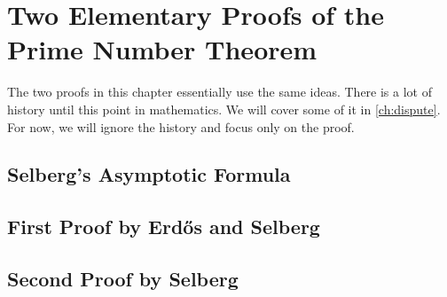 \documentclass[elemannt.tex]{subfile}
\begin{document}
	\chapter{Two Elementary Proofs of the Prime Number Theorem}\label{ch:pnt}
	The two proofs in this chapter essentially use the same ideas. There is a lot of history until this point in mathematics. We will cover some of it in \autoref{ch:dispute}. For now, we will ignore the history and focus only on the proof.
	\section{Selberg's Asymptotic Formula}\label{sec:fundamentallemma}
	\section{First Proof by Erd\H{o}s and Selberg}
	\section{Second Proof by Selberg}
\end{document}

